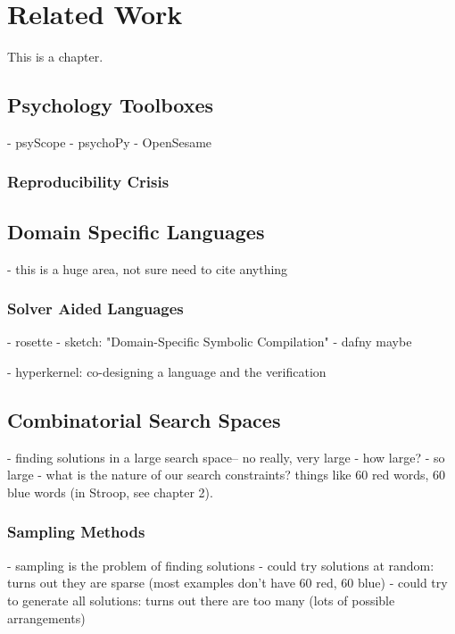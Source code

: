
\chapter{Related Work}

This is a chapter.


\section{Psychology Toolboxes}

- psyScope
- psychoPy
- OpenSesame

\subsection{Reproducibility Crisis}

\blah

\section{Domain Specific Languages}

- this is a huge area, not sure need to cite anything

\subsection{Solver Aided Languages}

- rosette
- sketch: "Domain-Specific Symbolic Compilation"
- dafny maybe

- hyperkernel: co-designing a language and the verification


\section{Combinatorial Search Spaces}

- finding solutions in a large search space-- no really, very large
- how large?
- so large
- what is the nature of our search constraints? things like 60 red words, 60 blue words (in Stroop, see chapter 2).


\subsection{Sampling Methods}

- sampling is the problem of finding solutions
- could try solutions at random: turns out they are sparse (most examples don't have 60 red, 60 blue)
- could try to generate all solutions: turns out there are too many (lots of possible arrangements)

